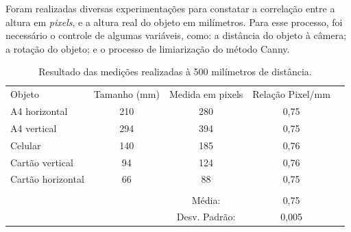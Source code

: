 \documentclass[12pt]{article}
\begin{document}
	Foram realizadas diversas experimentações para constatar a correlação entre a altura em \textit{pixels}, e a altura real do objeto em milímetros. Para esse processo, foi necessário o controle de algumas variáveis, como: a distância do objeto à câmera; a rotação do objeto; e o processo de limiarização do método Canny.
	
	
	\begin{table}[h!]
		\begin{tabular}{lcccl}
			\cline{1-4}
			\multicolumn{1}{|l|}{Objeto}            & \multicolumn{1}{c|}{Tamanho (mm)} & \multicolumn{1}{c|}{Medida em pixels} & \multicolumn{1}{c|}{Relação Pixel/mm} &  \\ \cline{1-4}
			\multicolumn{1}{|l|}{A4 horizontal}     & \multicolumn{1}{c|}{210}          & \multicolumn{1}{c|}{280}              & \multicolumn{1}{c|}{0,75}             &  \\ \cline{1-4}
			\multicolumn{1}{|l|}{A4 vertical}       & \multicolumn{1}{c|}{294}          & \multicolumn{1}{c|}{394}              & \multicolumn{1}{c|}{0,75}             &  \\ \cline{1-4}
			\multicolumn{1}{|l|}{Celular}           & \multicolumn{1}{c|}{140}          & \multicolumn{1}{c|}{185}              & \multicolumn{1}{c|}{0,76}             &  \\ \cline{1-4}
			\multicolumn{1}{|l|}{Cartão vertical}   & \multicolumn{1}{c|}{94}           & \multicolumn{1}{c|}{124}              & \multicolumn{1}{c|}{0,76}             &  \\ \cline{1-4}
			\multicolumn{1}{|l|}{Cartão horizontal} & \multicolumn{1}{c|}{66}           & \multicolumn{1}{c|}{88}               & \multicolumn{1}{c|}{0,75}             &  \\ \cline{1-4}
			\multicolumn{1}{c}{}                    &                                   &                                       &                                       &  \\ \cline{3-4}
			\multicolumn{1}{c}{}                    & \multicolumn{1}{c|}{}             & \multicolumn{1}{c|}{Média:}           & \multicolumn{1}{c|}{0,75}             &  \\ \cline{3-4}
			\multicolumn{1}{c}{}                    & \multicolumn{1}{c|}{}             & \multicolumn{1}{c|}{Desv. Padrão:}    & \multicolumn{1}{c|}{0,005}            &  \\ \cline{3-4}
		\end{tabular}
		\caption{Resultado das medições realizadas à 500 milímetros de distância.}
		\label{t1}
	\end{table}
	
\end{document}
